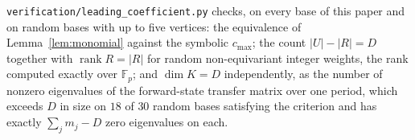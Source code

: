 \begin{remark}
\texttt{verification/leading\_coefficient.py} checks, on every base of this
paper and on random bases with up to five vertices: the equivalence of
Lemma~\ref{lem:monomial} against the symbolic $c_{\max}$; the count
$|U|-|R|=D$ together with $\operatorname{rank}R=|R|$ for random
non-equivariant integer weights, the rank computed exactly over $\mathbb F_p$;
and $\dim K=D$ independently, as the number of nonzero eigenvalues of the
forward-state transfer matrix over one period, which exceeds $D$ in size on
$18$ of $30$ random bases satisfying the criterion and has exactly
$\sum_jm_j-D$ zero eigenvalues on each.
\end{remark}

